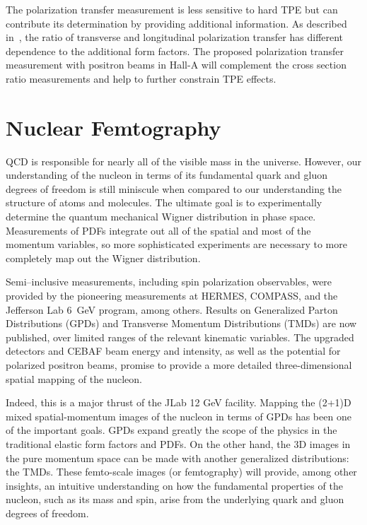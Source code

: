 The polarization transfer measurement is less sensitive to hard TPE but can contribute its determination by providing additional information. As described in~\cite{Carlson:2007sp}, the ratio of transverse and longitudinal polarization transfer has different dependence to the additional form factors. The proposed polarization transfer measurement with positron beams in Hall-A will complement the cross section ratio measurements and help to further constrain TPE effects.

\section{Nuclear Femtography}

QCD is responsible for nearly all of the visible mass in the universe. However, our understanding of the nucleon in terms of its fundamental quark and gluon degrees of freedom is still miniscule when compared to our understanding the structure of atoms and molecules. The ultimate goal is to experimentally determine the quantum mechanical Wigner distribution in phase space. Measurements of PDFs integrate out all of the spatial and most of the momentum variables, so more sophisticated experiments are necessary to more completely map out the Wigner distribution.

Semi--inclusive measurements, including spin polarization observables, were provided by the pioneering measurements at HERMES, COMPASS, and the Jefferson Lab 6~GeV program, among others. Results on Generalized Parton Distributions (GPDs) and Transverse Momentum Distributions (TMDs) are now published, over limited ranges of the relevant kinematic variables. The upgraded detectors and CEBAF beam energy and intensity, as well as the potential for polarized positron beams, promise to provide a more detailed three-dimensional spatial mapping of the nucleon.

Indeed, this is a major thrust of the JLab 12 GeV facility. Mapping the (2+1)D mixed spatial-momentum images of the nucleon in terms of GPDs has been one of the important goals. GPDs expand greatly the scope of the physics in the traditional elastic form factors %
and PDFs. On the other hand, the 3D images in the pure momentum space can be made with another generalized distributions: the TMDs. 
These femto-scale images (or femtography) will provide, among other insights, an intuitive understanding on how the fundamental properties of the nucleon, such as its mass and spin, arise from the underlying quark and gluon degrees of freedom. 

